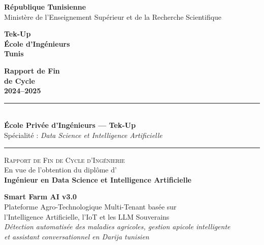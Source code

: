 \documentclass[12pt,a4paper,oneside]{report}
\begin{document}

\begin{titlepage}
\thispagestyle{empty}
\begin{center}
{\footnotesize\textbf{République Tunisienne}}\\[2pt]
{\footnotesize Ministère de l'Enseignement Supérieur et de la Recherche Scientifique}\\[12pt]

\begin{minipage}[c]{0.44\textwidth}\centering
\begin{tcolorbox}[enhanced,colback=farmblue!10,colframe=farmblue,arc=6pt,
  boxrule=1pt,width=4cm,height=2.2cm,valign=center,halign=center]
{\small\bfseries\color{farmblue}Tek-Up\\École d'Ingénieurs\\Tunis}
\end{tcolorbox}
\end{minipage}%
\begin{minipage}[c]{0.44\textwidth}\centering
\begin{tcolorbox}[enhanced,colback=farmgreen!10,colframe=farmgreen,arc=6pt,
  boxrule=1pt,width=4cm,height=2.2cm,valign=center,halign=center]
{\small\bfseries\color{farmgreen}Rapport de Fin\\de Cycle\\2024--2025}
\end{tcolorbox}
\end{minipage}

\vspace{0.5cm}
\rule{\textwidth}{1.5pt}\\[4pt]
{\large\textbf{École Privée d'Ingénieurs — Tek-Up}}\\
{\normalsize Spécialité : \textit{Data Science et Intelligence Artificielle}}\\[4pt]
\rule{\textwidth}{1.5pt}

\vspace{0.6cm}
{\large\textsc{Rapport de Fin de Cycle d'Ingénierie}}\\[4pt]
{\normalsize En vue de l'obtention du diplôme d'\\[2pt]
\textbf{Ingénieur en Data Science et Intelligence Artificielle}}

\vspace{0.7cm}
\begin{tcolorbox}[enhanced,colback=farmblue!8,colframe=farmblue,arc=8pt,
  boxrule=1.5pt,width=\textwidth]
\centering
{\LARGE\bfseries\color{farmblue}Smart Farm AI v3.0}\\[6pt]
{\large\color{farmgreen}Plateforme Agro-Technologique Multi-Tenant basée sur\\
l'Intelligence Artificielle, l'IoT et les LLM Souverains}\\[4pt]
{\normalsize\color{farmgray}\itshape
Détection automatisée des maladies agricoles, gestion apicole intelligente\\
et assistant conversationnel en Darija tunisien}
\end{tcolorbox}


\end{center}
\end{titlepage}
\end{document}

